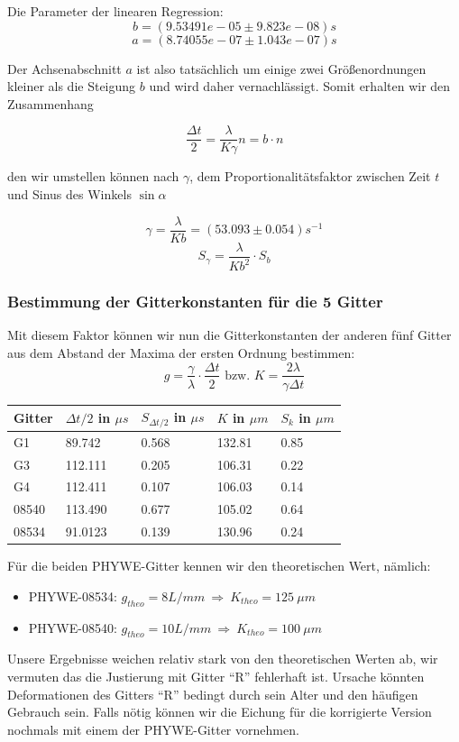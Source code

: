 Die Parameter der linearen Regression:
$$ b               = (9.53491e-05      \pm 9.823e-08) s $$
$$ a               = (8.74055e-07      \pm 1.043e-07) s $$

Der Achsenabschnitt $a$ ist also tatsächlich um einige zwei Größenordnungen kleiner als die Steigung $b$ und wird daher vernachlässigt. Somit erhalten wir den Zusammenhang

$$\frac{\Delta t}{2} = \frac{\lambda}{K\gamma}n = b\cdot n$$

den wir umstellen können nach $\gamma$, dem Proportionalitätsfaktor zwischen Zeit $t$ und Sinus des Winkels $\sin \alpha$ 

$$ \gamma = \frac{\lambda}{Kb} = (53.093 \pm 0.054) s^{-1} $$
$$S_{\gamma} = \frac{\lambda}{Kb^2} \cdot S_b $$


\subsubsection{Bestimmung der Gitterkonstanten f\"ur die 5 Gitter}

Mit diesem Faktor können wir nun die Gitterkonstanten der anderen fünf Gitter aus dem Abstand der Maxima der ersten Ordnung bestimmen:
$$ g = \frac{\gamma}{\lambda}\cdot \frac{\Delta t}{2} \text{ bzw. } K = \frac{2 \lambda }{\gamma \Delta t} $$
\begin{center}
\begin{tabular}{lllll}
\toprule 
Gitter & $\Delta t /2$ in $\mu s$ & $S_{\Delta t /2}$ in $\mu s$ & $K$ in $\mu m$ & $S_k$ in $\mu m$\\
\midrule
G1 & 89.742 & 0.568 & 132.81 & 0.85\\
G3 & 112.111 & 0.205 & 106.31 & 0.22\\
G4 & 112.411 & 0.107 & 106.03 & 0.14\\
08540 & 113.490 & 0.677 & 105.02 & 0.64\\
08534 & 91.0123 & 0.139 & 130.96 & 0.24\\
\bottomrule
\end{tabular} 
\end{center}

F\"ur die beiden PHYWE-Gitter kennen wir den theoretischen Wert, n\"amlich: 
\begin{itemize}
\item PHYWE-08534: $g_{theo} = 8 L/mm\ \Rightarrow \ K_{theo} = 125 \ \mu m$
\item PHYWE-08540: $g_{theo} = 10 L/mm\ \Rightarrow \ K_{theo} = 100 \ \mu m$
\end{itemize} 
Unsere Ergebnisse weichen relativ stark von den theoretischen Werten ab, wir vermuten das die Justierung mit Gitter ``R'' fehlerhaft ist. Ursache könnten Deformationen des Gitters ``R'' bedingt durch sein Alter und den häufigen Gebrauch sein. Falls nötig können wir die Eichung für die korrigierte Version nochmals mit einem der PHYWE-Gitter vornehmen.

